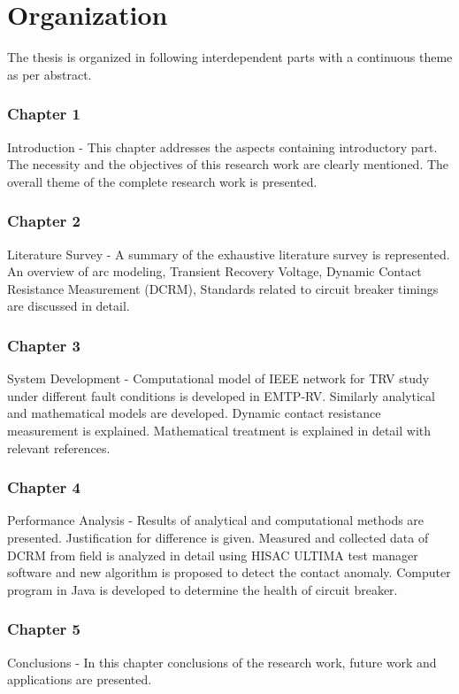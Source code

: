 \setlength{\parskip}{0em}
\clearpage
\section{Organization} 
The thesis is organized in following interdependent parts with a continuous theme as per abstract.
\subsubsection*{Chapter 1} Introduction - This chapter addresses the aspects containing introductory part. The necessity and the objectives of this research work are clearly mentioned. The overall theme of the complete research work is presented.
\subsubsection*{Chapter 2} Literature Survey - A summary of the exhaustive literature survey is represented. An overview of arc modeling, Transient Recovery Voltage, Dynamic Contact Resistance Measurement (DCRM), Standards related to circuit breaker timings are discussed in detail.
\subsubsection*{Chapter 3} System Development - Computational model of IEEE network for TRV study under different fault conditions is developed in EMTP-RV. Similarly analytical and mathematical models are developed. Dynamic contact resistance measurement is explained. Mathematical treatment is explained in detail with relevant references.
\subsubsection*{Chapter 4} Performance Analysis - Results of analytical and computational methods are presented. Justification for difference is given. Measured and collected data of DCRM from field is analyzed in detail using HISAC ULTIMA test manager software and new algorithm is proposed to detect the contact anomaly. Computer program in Java is developed to determine the health of circuit breaker.
\subsubsection*{Chapter 5} Conclusions - In this chapter conclusions of the research work, future work and  applications are presented.